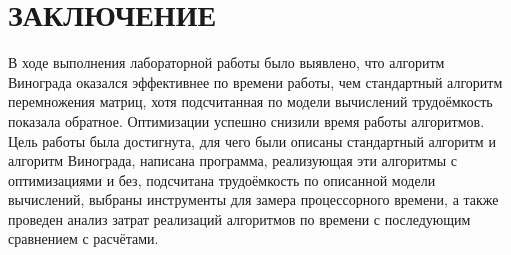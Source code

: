 \chapter*{ЗАКЛЮЧЕНИЕ}

В ходе выполнения лабораторной работы было выявлено, что алгоритм Винограда оказался эффективнее по времени работы, чем стандартный алгоритм перемножения матриц, хотя подсчитанная по модели вычислений трудоёмкость показала обратное. Оптимизации успешно снизили время работы алгоритмов. Цель работы была достигнута, для чего были описаны стандартный алгоритм и алгоритм Винограда, написана программа, реализующая эти алгоритмы с оптимизациями и без, подсчитана трудоёмкость по описанной модели вычислений, выбраны инструменты для замера процессорного времени, а также проведен анализ затрат реализаций алгоритмов по времени с последующим сравнением с расчётами.